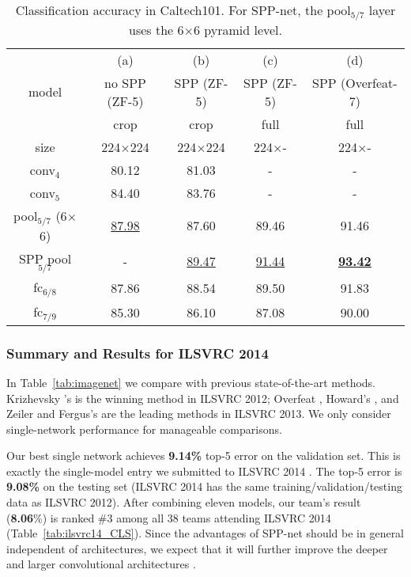 \documentclass[10pt,journal,cspaper,compsoc]{IEEEtran}
\begin{document}
\setlength{\tabcolsep}{8pt}
\begin{table*}[t]
\footnotesize
\begin{center}
\begin{tabular}{c|c c c c}
\hline
      & (a)       & (b) & (c) & (d)\\
model & no SPP (ZF-5) & SPP (ZF-5) & SPP (ZF-5) & SPP (Overfeat-7)\\
\hline
     &                    crop     &    crop    &  full &  full\\
size &                224$\times$224 & 224$\times$224 & 224$\times$- & 224$\times$-\\
\hline
conv$_4$ &              80.12 & 81.03 & -  & - \\
conv$_5$ &              84.40 & 83.76 & - & - \\
pool$_{5/7}$ (6$\times$6) & \underline{87.98} & 87.60 & 89.46 & 91.46\\
SPP pool$_{5/7}$          &   -   & \underline{89.47} & \underline{91.44} &  \underline{\textbf{93.42}} \\
fc$_{6/8}$ &                87.86 & 88.54 & 89.50 & 91.83 \\
fc$_{7/9}$ &                85.30 & 86.10 & 87.08 & 90.00 \\
\hline
\end{tabular}
\caption{Classification accuracy in Caltech101. For SPP-net, the pool$_{5/7}$ layer uses the 6$\times$6 pyramid level.}
\label{tab:caltech101}
\end{center}
\end{table*}

\subsubsection{Summary and Results for ILSVRC 2014}

In Table~\ref{tab:imagenet} we compare with previous state-of-the-art methods. Krizhevsky \etal's \cite{Krizhevsky2012} is the winning method in ILSVRC 2012; Overfeat \cite{Sermanet2013}, Howard's \cite{Howard2013}, and Zeiler and Fergus's \cite{Zeiler2013} are the leading methods in ILSVRC 2013. We only consider single-network performance for manageable comparisons.

Our best single network achieves \textbf{9.14\%} top-5 error on the validation set. This is exactly the single-model entry we submitted to ILSVRC 2014 \cite{Russakovsky2014}. The top-5 error is \textbf{9.08\%} on the testing set (ILSVRC 2014 has the same training/validation/testing data as ILSVRC 2012). After combining eleven models, our team's result (\textbf{8.06}\%) is ranked \#3 among all 38 teams attending ILSVRC 2014 (Table~\ref{tab:ilsvrc14_CLS}).
Since the advantages of SPP-net should be in general independent of architectures, we expect that it will further improve the deeper and larger convolutional architectures \cite{Simonyan2014,Szegedy2014}.
\end{document}
